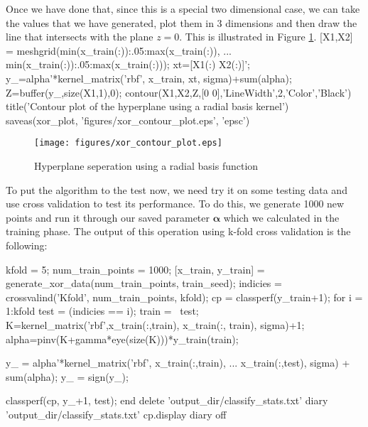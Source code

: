 \documentclass[11pt, twoside]{article}   	%
\newenvironment{matlab}{\comment}{\endcomment}
\begin{document}
Once we have done that, since this is a special two dimensional case, 
we can take the values that we have generated, plot them in 3 dimensions
and then draw the line that intersects with the plane $ z=0$. This is illustrated
in Figure \ref{fig:xor_contour_plot}.
\begin{matlab}
[X1,X2] = meshgrid(min(x_train(:)):.05:max(x_train(:)), ...
   min(x_train(:)):.05:max(x_train(:)));     %
xt=[X1(:) X2(:)]';                        %
y_=alpha'*kernel_matrix('rbf', x_train, xt, sigma)+sum(alpha);    
Z=buffer(y_,size(X1,1),0);                %
contour(X1,X2,Z,[0 0],'LineWidth',2,'Color','Black')
title('Contour plot of the hyperplane using a radial basis kernel')
saveas(xor_plot, 'figures/xor_contour_plot.eps', 'epsc')

\end{matlab}

\begin{figure}[h]
\centering
\texttt{[image: figures/xor\_contour\_plot.eps]}
\caption{Hyperplane seperation using a radial basis function}
\label{fig:xor_contour_plot} 
\end{figure}

\FloatBarrier

To put the algorithm to the test now, we need try it on some testing data
and use cross validation to test its performance. To do this, we generate
1000 new points and run it through our saved parameter $\bm{\alpha}$
 which we calculated in the training phase. The output of this operation
 using k-fold cross validation is the following:  
 \color{lightgray}
\color{black}

\begin{matlab}
kfold = 5; 
num_train_points = 1000; 
[x_train, y_train] = generate_xor_data(num_train_points, train_seed);
indicies = crossvalind('Kfold', num_train_points, kfold); 
cp = classperf(y_train+1);
for i = 1:kfold
   test = (indicies == i); train = ~test;
   K=kernel_matrix('rbf',x_train(:,train), x_train(:, train), sigma)+1; 
   alpha=pinv(K+gamma*eye(size(K)))*y_train(train);
   
   y_ = alpha'*kernel_matrix('rbf', x_train(:,train), ...
      x_train(:,test), sigma) + sum(alpha); 
   y_ = sign(y_);
   
   classperf(cp, y_+1, test);
end
delete 'output_dir/classify_stats.txt'
diary 'output_dir/classify_stats.txt'
cp.display
diary off
\end{matlab}
\end{document}
